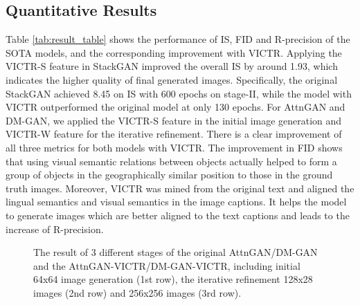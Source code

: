 \documentclass[11pt]{article}
\begin{document}
\subsection{Quantitative Results}
Table \ref{tab:result_table} shows the performance of IS, FID and R-precision of the SOTA models, and the corresponding improvement with VICTR. Applying the VICTR-S feature in StackGAN improved the overall IS by around 1.93, which indicates the higher quality of final generated images. Specifically, the original StackGAN achieved 8.45 on IS with 600 epochs on stage-II, while the model with VICTR outperformed the original model at only 130 epochs. For AttnGAN and DM-GAN, we applied the VICTR-S feature in the initial image generation and VICTR-W feature for the iterative refinement. There is a clear improvement of all three metrics for both models with VICTR. The improvement in FID shows that using visual semantic relations between objects actually helped to form a group of objects in the geographically similar position to those in the ground truth images. Moreover, VICTR was mined from the original text and aligned the lingual semantics and visual semantics in the image captions. It helps the model to generate images which are better aligned to the text captions and leads to the increase of R-precision.



\begin{figure*}[t]
\centering
{}
\label{fig:3stage_a}
\label{fig:3stage_b}
\caption[Optional caption for list of figures]{The result of 3 different stages of the original AttnGAN/DM-GAN and the AttnGAN-VICTR/DM-GAN-VICTR, including initial 64x64 image generation (1st row), the iterative refinement 128x28 images (2nd row) and 256x256 images (3rd row).}
\label{fig:3stage}
\label{fig:DM_3stage}
\end{figure*}
\end{document}
